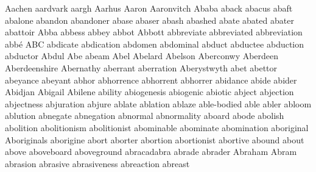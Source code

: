 Aachen aardvark aargh Aarhus Aaron Aaronvitch Ababa aback abacus abaft abalone abandon abandoner abase abaser abash abashed abate abated abater abattoir Abba abbess abbey abbot Abbott abbreviate abbreviated abbreviation abbé ABC abdicate abdication abdomen abdominal abduct abductee abduction abductor Abdul Abe abeam Abel Abelard Abelson Aberconwy Aberdeen Aberdeenshire Abernathy aberrant aberration Aberystwyth abet abettor abeyance abeyant abhor abhorrence abhorrent abhorrer abidance abide abider Abidjan Abigail Abilene ability abiogenesis abiogenic abiotic abject abjection abjectness abjuration abjure ablate ablation ablaze able-bodied able abler abloom ablution abnegate abnegation abnormal abnormality aboard abode abolish abolition abolitionism abolitionist abominable abominate abomination aboriginal Aboriginals aborigine abort aborter abortion abortionist abortive abound about above aboveboard aboveground abracadabra abrade abrader Abraham Abram abrasion abrasive abrasiveness abreaction abreast 